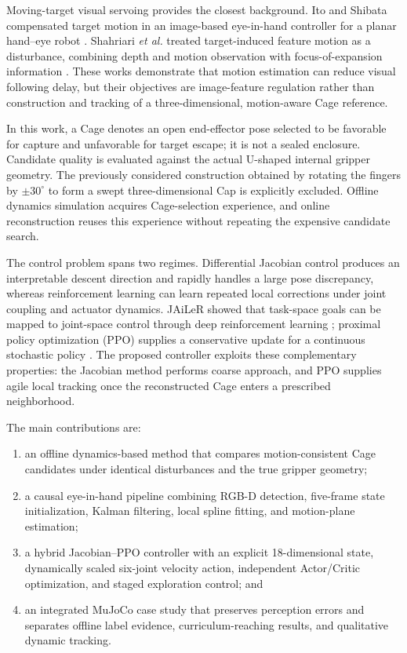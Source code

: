 \documentclass[conference]{IEEEtran}
\begin{document}
Moving-target visual servoing provides the closest background. Ito and Shibata compensated target motion in an image-based eye-in-hand controller for a planar hand--eye robot \cite{ito2009}. Shahriari \emph{et al.} treated target-induced feature motion as a disturbance, combining depth and motion observation with focus-of-expansion information \cite{shahriari2013}. These works demonstrate that motion estimation can reduce visual following delay, but their objectives are image-feature regulation rather than construction and tracking of a three-dimensional, motion-aware Cage reference.

In this work, a Cage denotes an open end-effector pose selected to be favorable for capture and unfavorable for target escape; it is not a sealed enclosure. Candidate quality is evaluated against the actual U-shaped internal gripper geometry. The previously considered construction obtained by rotating the fingers by $\pm30^{\circ}$ to form a swept three-dimensional Cap is explicitly excluded. Offline dynamics simulation acquires Cage-selection experience, and online reconstruction reuses this experience without repeating the expensive candidate search.

The control problem spans two regimes. Differential Jacobian control produces an interpretable descent direction and rapidly handles a large pose discrepancy, whereas reinforcement learning can learn repeated local corrections under joint coupling and actuator dynamics. JAiLeR showed that task-space goals can be mapped to joint-space control through deep reinforcement learning \cite{kumar2021}; proximal policy optimization (PPO) supplies a conservative update for a continuous stochastic policy \cite{schulman2017ppo}. The proposed controller exploits these complementary properties: the Jacobian method performs coarse approach, and PPO supplies agile local tracking once the reconstructed Cage enters a prescribed neighborhood.

The main contributions are:
\begin{enumerate}
    \item an offline dynamics-based method that compares motion-consistent Cage candidates under identical disturbances and the true gripper geometry;
    \item a causal eye-in-hand pipeline combining RGB-D detection, five-frame state initialization, Kalman filtering, local spline fitting, and motion-plane estimation;
    \item a hybrid Jacobian--PPO controller with an explicit 18-dimensional state, dynamically scaled six-joint velocity action, independent Actor/Critic optimization, and staged exploration control; and
    \item an integrated MuJoCo case study that preserves perception errors and separates offline label evidence, curriculum-reaching results, and qualitative dynamic tracking.
\end{enumerate}
\end{document}
